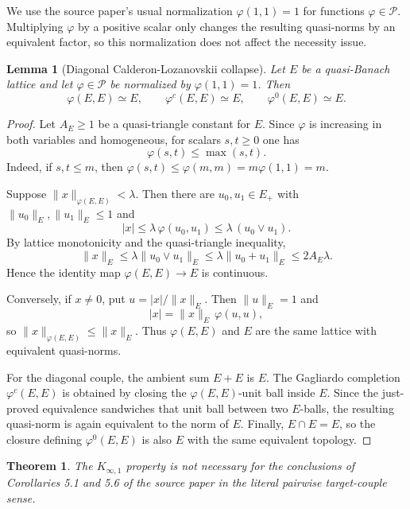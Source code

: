 \documentclass[11pt]{article}
\newtheorem{theorem}{Theorem}
\newtheorem{lemma}{Lemma}
\newcommand{\Kinf}{K_{\infty,1}}
\newcommand{\phic}{\varphi^c}
\newcommand{\phiz}{\varphi^0}
\begin{document}
We use the source paper's usual normalization \(\varphi(1,1)=1\) for functions \(\varphi\in\mathcal P\). Multiplying \(\varphi\) by a positive scalar only changes the resulting quasi-norms by an equivalent factor, so this normalization does not affect the necessity issue.

\begin{lemma}[Diagonal Calderon-Lozanovskii collapse]
Let \(E\) be a quasi-Banach lattice and let \(\varphi\in\mathcal P\) be normalized by \(\varphi(1,1)=1\). Then
\[
\varphi(E,E)\simeq E,\qquad \phic(E,E)\simeq E,\qquad \phiz(E,E)\simeq E.
\]
\end{lemma}

\begin{proof}
Let \(A_E\geq 1\) be a quasi-triangle constant for \(E\). Since \(\varphi\) is increasing in both variables and homogeneous, for scalars \(s,t\geq 0\) one has
\[
\varphi(s,t)\leq \max(s,t).
\]
Indeed, if \(s,t\leq m\), then \(\varphi(s,t)\leq\varphi(m,m)=m\varphi(1,1)=m\).

Suppose \(\|x\|_{\varphi(E,E)}<\lambda\). Then there are \(u_0,u_1\in E_+\) with \(\|u_0\|_E,\|u_1\|_E\leq 1\) and
\[
|x|\leq \lambda\,\varphi(u_0,u_1)\leq \lambda\,(u_0\vee u_1).
\]
By lattice monotonicity and the quasi-triangle inequality,
\[
\|x\|_E\leq \lambda\|u_0\vee u_1\|_E
\leq \lambda\|u_0+u_1\|_E
\leq 2A_E\lambda.
\]
Hence the identity map \(\varphi(E,E)\to E\) is continuous.

Conversely, if \(x\neq 0\), put \(u=|x|/\|x\|_E\). Then \(\|u\|_E=1\) and
\[
|x|=\|x\|_E\,\varphi(u,u),
\]
so \(\|x\|_{\varphi(E,E)}\leq\|x\|_E\). Thus \(\varphi(E,E)\) and \(E\) are the same lattice with equivalent quasi-norms.

For the diagonal couple, the ambient sum \(E+E\) is \(E\). The Gagliardo completion \(\phic(E,E)\) is obtained by closing the \(\varphi(E,E)\)-unit ball inside \(E\). Since the just-proved equivalence sandwiches that unit ball between two \(E\)-balls, the resulting quasi-norm is again equivalent to the norm of \(E\). Finally, \(E\cap E=E\), so the closure defining \(\phiz(E,E)\) is also \(E\) with the same equivalent topology.
\end{proof}

\begin{theorem}
The \(\Kinf\) property is not necessary for the conclusions of Corollaries 5.1 and 5.6 of the source paper in the literal pairwise target-couple sense.
\end{theorem}
\end{document}
